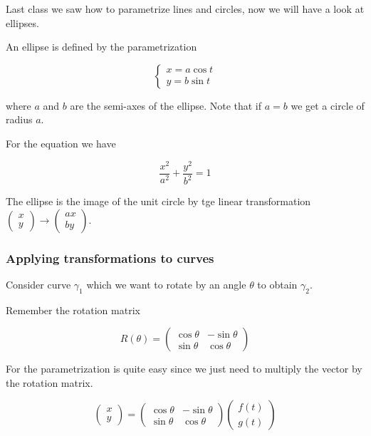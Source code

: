 \documentclass[10pt]{extarticle}
\begin{document}
Last class we saw how to parametrize lines and circles, now we will have a look at ellipses.

An ellipse is defined by the parametrization

\[
    \begin{cases}
        x = a \cos t \\
        y = b \sin t
    \end{cases}
\]

where $a$ and $b$ are the semi-axes of the ellipse. Note that if $a = b$ we get a circle of radius $a$.

For the equation we have

$$
    \frac{x^2}{a^2} + \frac{y^2}{b^2} = 1
$$

The ellipse is the image of the unit circle by tge linear transformation $\begin{pmatrix}
        x \\ y
    \end{pmatrix} \to \begin{pmatrix}
        ax \\ by
    \end{pmatrix}$.

\subsubsection{Applying transformations to curves}

Consider curve $\gamma_1$ which we want to rotate by an angle $\theta$ to obtain $\gamma_2$.

Remember the rotation matrix

$$
    R(\theta) = \begin{pmatrix}
        \cos \theta & -\sin \theta \\
        \sin \theta & \cos \theta
    \end{pmatrix}
$$

For the parametrization is quite easy since we just need to multiply the vector by the rotation matrix.

$$
    \begin{pmatrix}
        x \\ y
    \end{pmatrix} = \begin{pmatrix}
        \cos \theta & -\sin \theta \\
        \sin \theta & \cos \theta
    \end{pmatrix} \begin{pmatrix}
        f(t) \\ g(t)
    \end{pmatrix}
$$
\end{document}
